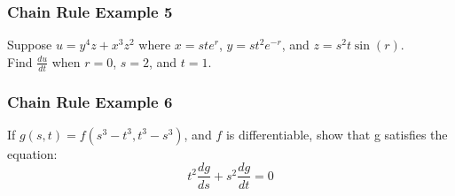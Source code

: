 \documentclass[12pt]{article}
\begin{document}
\subsubsection{Chain Rule Example 5}
Suppose \(u=y^4z + x^3z^2\) where \(x=ste^r\), \(y = st^2e^{-r}\), and \(z=s^2t\sin(r)\). \\
Find \(\frac{du}{dt}\) when \(r=0\), \(s=2\), and \(t=1\).

\subsubsection{Chain Rule Example 6}
If \(g(s,t) = f(s^3 - t^3, t^3 - s^3)\), and \(f\) is differentiable, show that g satisfies the equation:
\[
	t^2 \frac{dg}{ds} + s^2 \frac{dg}{dt} = 0
\]
\end{document}

